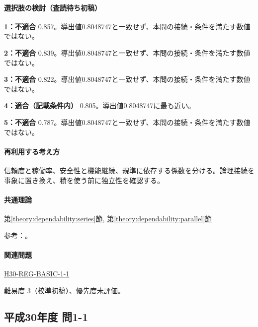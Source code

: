 \paragraph{選択肢の検討（査読待ち初稿）}\mbox{}\par

\noindent\textbf{1：不適合} 0.857。導出値0.8048747と一致せず、本問の接続・条件を満たす数値ではない。\par

\noindent\textbf{2：不適合} 0.839。導出値0.8048747と一致せず、本問の接続・条件を満たす数値ではない。\par

\noindent\textbf{3：不適合} 0.822。導出値0.8048747と一致せず、本問の接続・条件を満たす数値ではない。\par

\noindent\textbf{4：適合（記載条件内）} 0.805。導出値0.8048747に最も近い。\par

\noindent\textbf{5：不適合} 0.787。導出値0.8048747と一致せず、本問の接続・条件を満たす数値ではない。\par

\paragraph{再利用する考え方} 信頼度と稼働率、安全性と機能継続、規準に依存する係数を分ける。論理接続を事象に置き換え、積を使う前に独立性を確認する。

\paragraph{共通理論} \hyperref[theory:dependability:series]{第\ref*{theory:dependability:series}節}, \hyperref[theory:dependability:parallel]{第\ref*{theory:dependability:parallel}節}

\par 参考：\cite{reliability_nist_series,reliability_nist_parallel}。

\paragraph{関連問題} \hyperref[q:h30-reg-basic-1-1]{H30-REG-BASIC-1-1}

\par 難易度 3（校準初稿）、優先度未評価。

\subsection{平成30年度 問1-1}
\label{q:h30-reg-basic-1-1}

